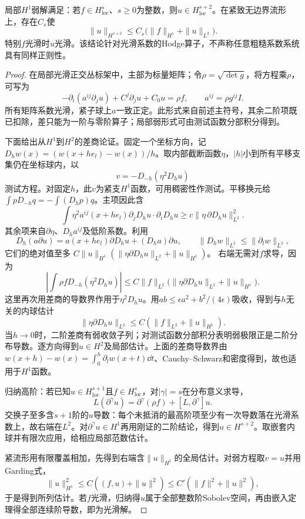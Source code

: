 \begin{lemma}[从弱解到光滑解]\label{lem:hodge-weak-regularity}
局部$H^1$弱解满足：若$f\in H^s_{\mathrm{loc}}$、$s\geq0$为整数，则$u\in H^{s+2}_{\mathrm{loc}}$。在紧致无边界流形上，存在$C_s$使
\[
 \|u\|_{H^{s+2}}\leq C_s\bigl(\|f\|_{H^s}+\|u\|_{L^2}\bigr).
\]
特别$f$光滑时$u$光滑。该结论针对光滑系数的Hodge算子，不声称任意粗糙系数系统具有同样正则性。
\end{lemma}
\begin{proof}
在局部光滑正交丛标架中，主部为标量矩阵；令$\rho=\sqrt{\det g}$，将方程乘$\rho$，可写为
\[
 -\partial_i(a^{ij}\partial_j u)+C^j\partial_ju+C_0u=\rho f,
 \qquad a^{ij}=\rho g^{ij}I.
\]
所有矩阵系数光滑，紧子球上$a$一致正定。此形式来自前述主符号，其余二阶项既已扣除，差只能为一阶与零阶算子；局部弱形式可由测试函数分部积分得到。

下面给出从$H^1$到$H^2$的差商论证。固定一个坐标方向，记$D_hw(x)=(w(x+he_l)-w(x))/h$。取内部截断函数$\eta$，$|h|$小到所有平移支集仍在坐标球内，以
\[
 v=-D_{-h}(\eta^2D_hu)
\]
测试方程。对固定$h$，此$v$为紧支$H^1$函数，可用稠密性作测试。平移换元给$\int pD_{-h}q=-\int(D_hp)q$。主项因此含
\[
 \int\eta^2 a^{ij}(x+he_l)
       \partial_jD_hu\cdot\partial_iD_hu
 \geq c\|\eta\,\partial D_hu\|_{L^2}^2.
\]
其余项来自$\partial\eta$、$D_ha^{ij}$及低阶系数。利用
\[
 D_h(a\partial u)=a(x+he_l)\partial D_hu+(D_ha)\partial u,
 \qquad \|D_hw\|_{L^2}\leq\|\partial_lw\|_{L^2},
\]
它们的绝对值至多
$C\|u\|_{H^1}(\|\eta\partial D_hu\|_{L^2}+\|u\|_{H^1})$。
右端无需对$f$求导，因为
\[
 \left|\int\rho fD_{-h}(\eta^2D_hu)\right|
 \leq C\|f\|_{L^2}
       \bigl(\|\eta\partial D_hu\|_{L^2}+\|u\|_{H^1}\bigr).
\]
这里再次用差商的导数界作用于$\eta^2D_hu$。用$ab\leq\epsilon a^2+b^2/(4\epsilon)$吸收，得到与$h$无关的内球估计
\[
 \|\eta\partial D_hu\|_{L^2}
 \leq C(\|f\|_{L^2}+\|u\|_{H^1}).
\]
当$h\to0$时，二阶差商有弱收敛子列；对测试函数分部积分表明弱极限正是二阶分布导数。逐方向得到$u\in H^2$及局部估计。上面的差商导数界由$w(x+h)-w(x)=\int_0^h\partial_lw(x+t)\dd t$、Cauchy--Schwarz和密度得到，故也适用于$H^1$函数。

归纳高阶：若已知$u\in H^{s+1}_{\mathrm{loc}}$且$f\in H^s_{\mathrm{loc}}$，对$|\gamma|=s$在分布意义求导，
\[
 L(\partial^\gamma u)=\partial^\gamma(\rho f)+[L,\partial^\gamma]u.
\]
交换子至多含$s+1$阶的$u$导数：每个未抵消的最高阶项至少有一次导数落在光滑系数上，故右端在$L^2$。对$\partial^\gamma u\in H^1$再用刚证的二阶结论，得到$u\in H^{s+2}$。取嵌套内球并有限次应用，给相应局部范数估计。

紧流形用有限覆盖相加，先得到右端含$\|u\|_{H^1}$的全局估计。对弱方程取$v=u$并用Garding式，
\[
 \|u\|_{H^1}^2\leq C((f,u)+\|u\|^2)
 \leq C'(\|f\|^2+\|u\|^2),
\]
于是得到所列估计。若$f$光滑，归纳得$u$属于全部整数阶Sobolev空间，再由嵌入定理得全部连续阶导数，即为光滑解。
\end{proof}
